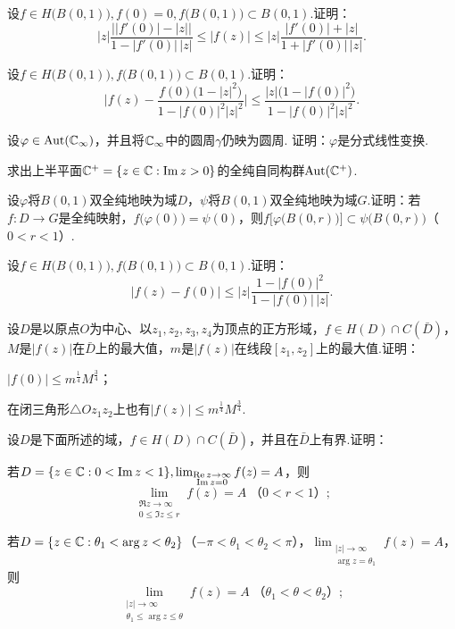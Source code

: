 \begin{xiti}
  \item 设$f\in H\big(B(0,1)\big),f(0)=0,f\big(B(0,1)\big)\subset B(0,1)$.证明：
      \[
        |z|\frac{\big||f'(0)|-|z|\big|}{1-|f'(0)|\,|z|}\le|f(z)|\le|z|
        \frac{|f'(0)|+|z|}{1+|f'(0)|\,|z|}.
      \]
  \item 设$f\in H\big(B(0,1)\big),f\big(B(0,1)\big)\subset B(0,1)$.证明：
      \[
        \bigg|f(z)-\frac{f(0)\big(1-|z|^2\big)}{1 -|f(0)|^2|z|^2}\bigg|
        \le\frac{|z|\big(1-|f(0)|^2\big)}{1-|f(0)|^2|z|^2}.
      \]
  \item 设$\varphi\in\operatorname{Aut}(\mathbb C_\infty)$，并且将$\mathbb C_\infty$中的圆周$\gamma$仍映为圆周. 证明：$\varphi$是分式线性变换.
  \item 求出上半平面$\mathbb C^+=\{z\in \mathbb C:\operatorname{Im} z>0\}$的全纯自同构群$\operatorname{Aut}(\mathbb C^+)$.
  \item 设$\varphi$将$B(0,1)$双全纯地映为域$D$，$\psi$将$B(0,1)$双全纯地映为域$G$.证明：若$f:D\to G$是全纯映射，$f\big(\varphi(0)\big)=\psi(0)$，则$f\big[\varphi\big(B(0,r)\big)\big]
      \subset \psi\big(B(0,r)\big)$（$0<r<1$）.
  \item 设$f\in H\big(B(0,1)\big),f\big(B(0,1)\big)\subset B(0,1)$.证明：
      \[
        |f(z)-f(0)|\le|z|\frac{1-|f(0)|^2}{1-|f(0)|\,|z|}.
      \]
  \item 设$D$是以原点$O$为中心、以$z_1,z_2,z_3,z_4$为顶点的正方形域，$f\in H(D)\cap C(\bar D)$，$M$是$|f(z)|$在$\bar D$上的最大值，$m$是$|f(z)|$在线段$[z_1,z_2]$上的最大值.证明：
    \begin{enuma}
      \item $|f(0)|\le m^{\frac14}M^{\frac34}$；
      \item 在闭三角形$\triangle Oz_1z_2$上也有$|f(z)|\le m^{\frac14}M^{\frac34}$.
    \end{enuma}
  \item 设$D$是下面所述的域，$f\in H(D)\cap C(\bar D)$，并且在$\bar D$上有界.证明：
    \begin{enuma}
      \item 若$D=\{z\in\mathbb C:0<\operatorname{Im} z<1\},\lim_{\substack{\operatorname{Re} z\to\infty\\\operatorname{Im} z=0}}f(z)=A$，则
          \[
            \lim_{\substack{\Re z\to\infty\\0\le\Im z\le r}}f(z)=A\;\mbox{（$0<r<1$）};
          \]
      \item 若$D=\{z\in \mathbb C:\theta_1<\arg z<\theta_2\}$（$-\pi<\theta_1<\theta_2<\pi$），$\lim_{\substack{|z|\to\infty\\
      \arg z=\theta_1}}f(z)=A$，则
      \[\lim_{\substack{|z|\to\infty\\\theta_1\le\arg z\le\theta}}f(z)=A\;\mbox{（$\theta_1<\theta<\theta_2$）};\]

\end{enuma}
\end{xiti}
